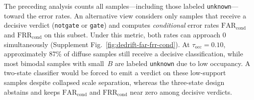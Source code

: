 The preceding analysis counts all samples---including those
labeled \texttt{unknown}---toward the error rates. An
alternative view considers only samples that receive a
decisive verdict (\texttt{notgate} or \texttt{gate}) and
computes \emph{conditional} error rates
$\mathrm{FAR_{cond}}$ and $\mathrm{FRR_{cond}}$ on this
subset. Under this metric, both rates can approach 0
simultaneously (Supplement Fig.~\ref{fig:dedrift-far-frr-cond}).
At $\tau_{\text{occ}}{=}0.10$, approximately 87\% of diffuse
samples still receive a decisive classification, while most
bimodal samples with small~$B$ are labeled \texttt{unknown}
due to low occupancy.
A two-state classifier would be forced to emit a verdict on
these low-support samples despite collapsed scale separation,
whereas the three-state design abstains and keeps
$\mathrm{FAR_{cond}}$ and $\mathrm{FRR_{cond}}$ near zero
among decisive verdicts.
